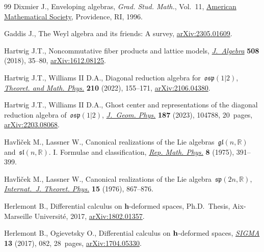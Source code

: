 \documentclass[10pt,a4paper]{amsart}
\numberwithin{equation}{section}
\begin{document}
\begin{thebibliography}{99}
Dixmier J., Enveloping algebras, \textit{Grad. Stud. Math.}, Vol.~11, \href{https://doi.org/10.1090/gsm/011}{American
 Mathematical Society}, Providence, RI, 1996.

Gaddis J., The {W}eyl algebra and its friends: {A} survey, \href{https://arxiv.org/abs/2305.01609}{arXiv:2305.01609}.

Hartwig J.T., Noncommutative fiber products and lattice models,
 \href{https://doi.org/10.1016/j.jalgebra.2018.04.015}{\textit{J.~Algebra}} \textbf{508} (2018), 35--80, \href{https://arxiv.org/abs/1612.08125}{arXiv:1612.08125}.

Hartwig J.T., Williams II D.A., Diagonal reduction algebra
 for~{$\mathfrak{osp}(1|2)$}, \href{https://doi.org/10.1134/S0040577922020015}{\textit{Theoret. and Math. Phys.}} \textbf{210}
 (2022), 155--171, \href{https://arxiv.org/abs/2106.04380}{arXiv:2106.04380}.

Hartwig J.T., Williams II D.A., Ghost center and representations of the
 diagonal reduction algebra of~{$\mathfrak{osp}(1|2)$}, \href{https://doi.org/10.1016/j.geomphys.2023.104788}{\textit{J.~Geom.
 Phys.}} \textbf{187} (2023), 104788, 20~pages, \href{https://arxiv.org/abs/2203.08068}{arXiv:2203.08068}.

Havl\'{\i}\v{c}ek M., Lassner W., Canonical realizations of the {L}ie
 algebras~{$\mathfrak{gl}(n,\mathbb{R})$} and~{$\mathfrak{sl}(n,\mathbb{R})$}.
 {I}. {F}ormulae and classification, \href{https://doi.org/10.1016/0034-4877(75)90081-6}{\textit{Rep. Math. Phys.}}
 \textbf{8} (1975), 391--399.

Havl\'{\i}\v{c}ek M., Lassner W., Canonical realizations of the {L}ie
 algebra~{$\mathfrak{sp}(2n, \mathbb{R})$}, \href{https://doi.org/10.1007/BF01807449}{\textit{Internat.~J. Theoret.
 Phys.}} \textbf{15} (1976), 867--876.

Herlemont B., Differential calculus on $\mathbf{h}$-deformed spaces, Ph.D.~Thesis, {A}ix-Marseille {U}niversit\'e, 2017, \href{https://arxiv.org/abs/1802.01357}{arXiv:1802.01357}.

Herlemont B., Ogievetsky O., Differential calculus on {$\bf h$}-deformed
 spaces, \href{https://doi.org/10.3842/SIGMA.2017.082}{\textit{SIGMA}} \textbf{13} (2017), 082, 28~pages,
 \href{https://arxiv.org/abs/1704.05330}{arXiv:1704.05330}.


\end{thebibliography}
\end{document}
